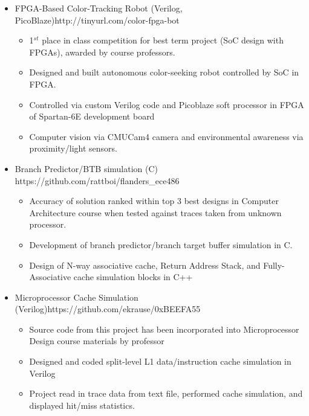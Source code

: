 \documentclass{article}
\begin{document}
\newpage
\fancyhf{}

	\vspace{-15pt}
	
	\begin{itemize}
		\item \NameUrlTextBlock
		{FPGA-Based Color-Tracking Robot (Verilog, PicoBlaze)}{http://tinyurl.com/color-fpga-bot}\vspace{-16pt}
		\begin{itemize}
			\item 1$^{st}$ place in class competition for best term project (SoC design with FPGAs), awarded by course professors. \vspace{-3pt}
			\item Designed and built autonomous color-seeking robot controlled by SoC in FPGA.  \vspace{-3pt}
			\item Controlled via custom Verilog code and Picoblaze soft processor in FPGA of Spartan-6E development board
			\vspace{-3pt} 
			\item Computer vision via CMUCam4 camera and environmental awareness via proximity/light sensors.\vspace{-3pt}   		
			\end{itemize}
 
		\item \NameUrlTextBlock
		{Branch Predictor/BTB simulation (C)}	{https://github.com/rattboi/flanders_ece486}\vspace{-16pt}
		\begin{itemize}
			\item Accuracy of solution ranked within top 3 best designs in Computer Architecture course when tested against traces taken from unknown processor.\vspace{-3pt} 
			\item Development of branch predictor/branch target buffer simulation in C.\vspace{-3pt} 
			\item Design of N-way associative cache, Return Address Stack, and Fully-Associative cache simulation blocks in C++			
		\end{itemize}
		
		\item \NameUrlTextBlock
		{Microprocessor Cache Simulation (Verilog)}{https://github.com/ekrause/0xBEEFA55}\vspace{-16pt}
		\begin{itemize}
			\item Source code from this project has been incorporated into Microprocessor Design course materials by professor\vspace{-3pt} 
			\item Designed and coded split-level L1 data/instruction cache simulation in Verilog\vspace{-3pt}
			\item Project read in trace data from text file, performed cache simulation, and displayed hit/miss statistics.		\vspace{-3pt}
		\end{itemize}
		
	\end{itemize}
	\vspace{-4pt}
\end{document}
